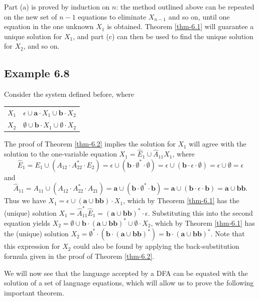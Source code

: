 \begin{thm}
Part (a) is proved by induction on $n$: the method outlined above can be
repeated on the new set of $n-1$ equations to eliminate $X_{n-1}$ and so on,
until one equation in the one unknown $X_1$ is obtained. Theorem \ref{thm-6.1} will
guarantee a unique solution for $X_1$, and part (c) can then be used to find the
unique solution for $X_2$, and so on.
\end{thm}

\subsection*{Example 6.8}

Consider the system defined before, where
\begin{center}\begin{tabular}{r@{ = }l}
$X_1$ & $\epsilon \cup \pmb{a} \cdot X_1 \cup \pmb{b} \cdot X_2$ \\
$X_2$ & $\emptyset \cup \pmb{b} \cdot X_1 \cup \emptyset \cdot X_2$
\end{tabular}\end{center}
The proof of Theorem \ref{thm-6.2} implies the solution for $X_1$ will agree with the
solution to the one-variable equation $X_1 = \hat{E}_1 \cup \hat{A}_{11}X_1$,
where
\[ \hat{E}_1 = E_1 \cup (A_{12}\cdot A^*_{22}\cdot E_2) = \epsilon \cup (\pmb{b} \cdot \emptyset^*  
	\cdot \emptyset) = \epsilon \cup (\pmb{b}\cdot\epsilon\cdot\emptyset) =
	\epsilon \cup \emptyset = \epsilon \]
and
\[ \hat{A}_{11} = A_{11} \cup (A_{12} \cdot A^*_{22} \cdot A_{21}) = \pmb{a}
	\cup (\pmb{b}\cdot\emptyset^*  \cdot\pmb{b}) = \pmb{a} \cup (\pmb{b} \cdot
	\epsilon \cdot \pmb{b}) = \pmb{a} \cup \pmb{bb}. \]
Thus we have $X_1 = \epsilon \cup (\pmb{a} \cup \pmb{bb})\cdot X_1$, which by
Theorem \ref{thm-6.1} has the (unique) solution $X_1 = \hat{A}^*_{11}\hat{E}_1 = (\pmb{a}
\cup \pmb{bb})^*   \cdot \epsilon$. Substituting this into the second equation
yields $X_2 = \emptyset \cup \pmb{b}\cdot(\pmb{a}\cup\pmb{bb})^*\cup\emptyset
\cdot X_2$, which by Theorem \ref{thm-6.1} has the (unique) solution $X_2=\emptyset^*  \cdot
(\pmb{b}\cdot(\pmb{a}\cup\pmb{bb})^*) = \pmb{b} \cdot (\pmb{a}\cup\pmb{bb})^*$.
Note that this expression for $X_2$ could also be found by applying the
back-substitution formula given in the proof of Theorem \ref{thm-6.2}.

We will now see that the language accepted by a DFA can be equated with the
solution of a set of language equations, which will allow us to prove the
following important theorem.

